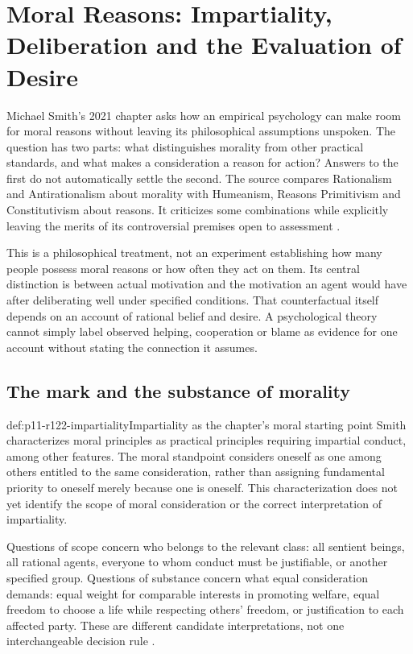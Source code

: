 \chapter{Moral Reasons: Impartiality, Deliberation and the Evaluation of Desire}
\label{sec:p11-rationality-12-2}

Michael Smith's 2021 chapter asks how an empirical psychology can make
room for moral reasons without leaving its philosophical assumptions
unspoken. The question has two parts: what distinguishes morality from
other practical standards, and what makes a consideration a reason for
action? Answers to the first do not automatically settle the second.
The source compares Rationalism and Antirationalism about morality with
Humeanism, Reasons Primitivism and Constitutivism about reasons. It
criticizes some combinations while explicitly leaving the merits of its
controversial premises open to assessment
\parencite[pp.~693--700]{Smith2021MoralReasons}.

This is a philosophical treatment, not an experiment establishing how
many people possess moral reasons or how often they act on them. Its
central distinction is between actual motivation and the motivation an
agent would have after deliberating well under specified conditions.
That counterfactual itself depends on an account of rational belief and
desire. A psychological theory cannot simply label observed helping,
cooperation or blame as evidence for one account without stating the
connection it assumes.

\section{The mark and the substance of morality}
\label{sec:p11-r122-morality}

\begin{hbdefinition}{def:p11-r122-impartiality}{Impartiality as the chapter's moral starting point}
Smith characterizes moral principles as practical principles requiring
impartial conduct, among other features. The moral standpoint considers
oneself as one among others entitled to the same consideration, rather
than assigning fundamental priority to oneself merely because one is
oneself. This characterization does not yet identify the scope of moral
consideration or the correct interpretation of impartiality.

Questions of scope concern who belongs to the relevant class: all
sentient beings, all rational agents, everyone to whom conduct must be
justifiable, or another specified group. Questions of substance concern
what equal consideration demands: equal weight for comparable interests
in promoting welfare, equal freedom to choose a life while respecting
others' freedom, or justification to each affected party. These are
different candidate interpretations, not one interchangeable decision
rule \parencite[pp.~693--694]{Smith2021MoralReasons}.
\end{hbdefinition}

